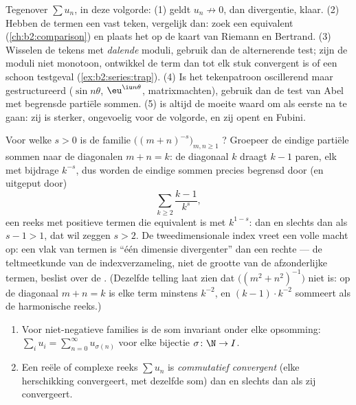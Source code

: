 \begin{method}\label{met:b2:series:choosing}
Tegenover $\sum u_n$, in deze volgorde: (1) geldt $u_n \not\to 0$,
dan divergentie, klaar. (2) Hebben de termen een vast teken,
vergelijk dan: zoek een equivalent (\cref{ch:b2:comparison}) en
plaats het op de kaart van Riemann en Bertrand. (3) Wisselen de
tekens met \emph{dalende} moduli, gebruik dan de alternerende test;
zijn de moduli niet monotoon, ontwikkel de term dan tot elk stuk
 convergent is of een schoon testgeval
(\cref{ex:b2:series:trap}). (4) Is het tekenpatroon oscillerend
maar gestructureerd ($\sin n\theta$, $\eu^{\iu n\theta}$,
matrixmachten), gebruik dan de test van Abel met begrensde partiële
sommen. (5)  is altijd de moeite waard om als
eerste na te gaan: zij is sterker, ongevoelig voor de volgorde, en
zij opent  en Fubini.
\end{method}

\begin{example}\label{ex:b2:series:diagonalcount}
Voor welke $s > 0$ is de familie $\bigl((m + n)^{-s}\bigr)_{m, n
\geq 1}$ ? Groepeer de eindige partiële sommen naar de
diagonalen $m + n = k$: de diagonaal $k$ draagt $k - 1$ paren, elk
met bijdrage $k^{-s}$, dus worden de eindige sommen precies
begrensd door (en uitgeput door)
\[
\sum_{k \geq 2} \frac{k - 1}{k^{s}} ,
\]
een reeks met positieve termen die equivalent is met $k^{1-s}$:
 dan en slechts dan als $s - 1 > 1$, dat wil zeggen $s >
2$. De tweedimensionale index vreet een volle macht op: een vlak
van termen is ``één dimensie divergenter'' dan een rechte --- de
teltmeetkunde van de indexverzameling, niet de grootte van de
afzonderlijke termen, beslist over de . (Dezelfde
telling laat zien dat $\bigl((m^2 + n^2)^{-1}\bigr)$ niet
 is: op de diagonaal $m + n = k$ is elke term minstens
$k^{-2}$, en $(k-1)\cdot k^{-2}$ sommeert als de harmonische
reeks.)
\end{example}

\begin{theorem}\label{thm:b2:series:rearrangement}
\begin{enumerate}
  \item Voor niet-negatieve families is de som invariant onder elke
        opsomming: $\sum_{i} u_i = \sum_{n=0}^{\infty}
        u_{\sigma(n)}$ voor elke bijectie $\sigma \colon \N \to
        I$.
  \item Een reële of complexe reeks $\sum u_n$ is
        \emph{commutatief convergent} (elke herschikking
        convergeert, met dezelfde som) dan en slechts dan als zij
         convergeert.
\end{enumerate}
\end{theorem}


